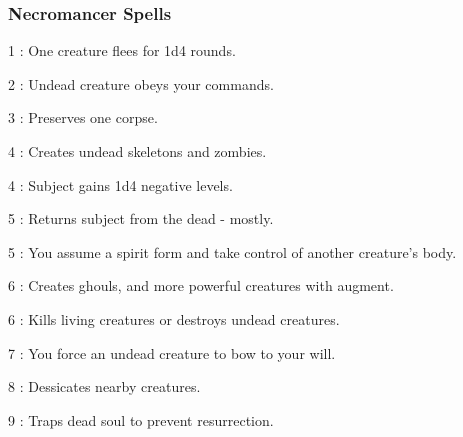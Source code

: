 \subsubsection{Necromancer Spells}
\begin{list}{}{\leftmargin=1em}
\item[1] : One creature flees for 1d4 rounds.
\item[2] : Undead creature obeys your commands.
\item[3] : Preserves one corpse.
\item[4] : Creates undead skeletons and zombies.
\item[4] : Subject gains 1d4 negative levels.
\item[5] : Returns subject from the dead - mostly.
\item[5] : You assume a spirit form and take control of another creature's body.
\item[6] : Creates ghouls, and more powerful creatures with augment.
\item[6] : Kills living creatures or destroys undead creatures.
\item[7] : You force an undead creature to bow to your will.
\item[8] : Dessicates nearby creatures.
\item[9] : Traps dead soul to prevent resurrection.
\end{list}
